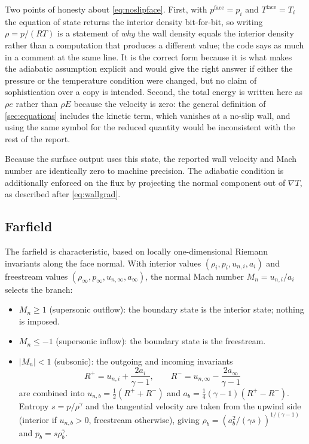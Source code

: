 Two points of honesty about \cref{eq:noslipface}. First, with $p^{\mathrm{face}}=p_i$
and $T^{\mathrm{face}}=T_i$ the equation of state returns the interior density
bit-for-bit, so writing $\rho=p/(RT)$ is a statement of \emph{why} the wall density
equals the interior density rather than a computation that produces a different value;
the code says as much in a comment at the same line. It is the correct form because it
is what makes the adiabatic assumption explicit and would give the right answer if
either the pressure or the temperature condition were changed, but no claim of
sophistication over a copy is intended. Second, the total energy is written here as
$\rho e$ rather than $\rho E$ because the velocity is zero: the general definition of
\cref{sec:equations} includes the kinetic term, which vanishes at a no-slip wall, and
using the same symbol for the reduced quantity would be inconsistent with the rest of
the report.

Because the surface output uses this state, the reported wall velocity and Mach
number are identically zero to machine precision. The adiabatic condition is
additionally enforced on the flux by projecting the normal component out of
$\nabla T$, as described after \cref{eq:wallgrad}.

\subsection{Farfield}

The farfield is characteristic, based on locally one-dimensional Riemann
invariants along the face normal. With interior values $(\rho_i,p_i,u_{n,i},a_i)$
and freestream values $(\rho_\infty,p_\infty,u_{n,\infty},a_\infty)$, the normal
Mach number $M_n=u_{n,i}/a_i$ selects the branch:

\begin{itemize}
  \item $M_n\ge 1$ (supersonic outflow): the boundary state is the interior state;
  nothing is imposed.
  \item $M_n\le -1$ (supersonic inflow): the boundary state is the freestream.
  \item $|M_n|<1$ (subsonic): the outgoing and incoming invariants
  \begin{equation}
    R^+=u_{n,i}+\frac{2a_i}{\gamma-1},\qquad
    R^-=u_{n,\infty}-\frac{2a_\infty}{\gamma-1}
  \end{equation}
  are combined into
  $u_{n,b}=\tfrac12(R^++R^-)$ and $a_b=\tfrac14(\gamma-1)(R^+-R^-)$. Entropy
  $s=p/\rho^\gamma$ and the tangential velocity are taken from the upwind side
  (interior if $u_{n,b}>0$, freestream otherwise), giving
  $\rho_b=\left(a_b^2/(\gamma s)\right)^{1/(\gamma-1)}$ and
  $p_b=s\rho_b^\gamma$.
\end{itemize}

